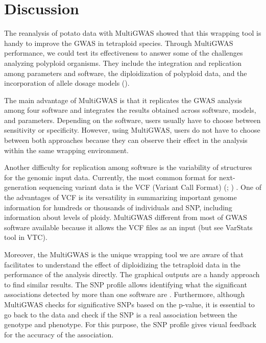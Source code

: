 \documentclass{article}
\begin{document}
\section{Discussion}


The reanalysis of potato data with MultiGWAS showed that this wrapping tool is handy to improve the GWAS in tetraploid species. Through MultiGWAS performance, we could test its effectiveness to answer some of the challenges analyzing polyploid organisms. They include the integration and replication among parameters and software, the diploidization of polyploid data, and the incorporation of allele dosage models (\cite{dufresne2014}). 

The main advantage of MultiGWAS is that it replicates the GWAS analysis among four software and integrates the results obtained across software, models, and parameters. Depending on the software, users usually have to choose between sensitivity or specificity. However, using MultiGWAS, users do not have to choose between both approaches because they can observe their effect in the analysis within the same wrapping environment.  

Another difficulty for replication among software is the variability of structures for the genomic input data. Currently, the most common format for next-generation sequencing variant data is the VCF (Variant Call Format) (\cite{Danecek2011}; \cite{Ebbert2014}) . One of the advantages of VCF is its versatility in summarizing important genome information for hundreds or thousands of individuals and SNP, including information about levels of ploidy. MultiGWAS different from most of GWAS software available because it allows the VCF files as an input (but see VarStats tool in VTC).  

Moreover, the MultiGWAS is the unique wrapping tool we are aware of that facilitates to understand the effect of diploidizing the tetraploid data in the performance of the analysis directly. The graphical outputs are a handy approach to find similar results. The SNP profile allows identifying what the significant associations detected by more than one software are . Furthermore, although MultiGWAS checks for significative SNPs based on the p-value, it is essential to go back to the data and check if the SNP is a real association between the genotype and phenotype. For this purpose, the SNP profile gives visual feedback for the accuracy of the association.
\end{document}
